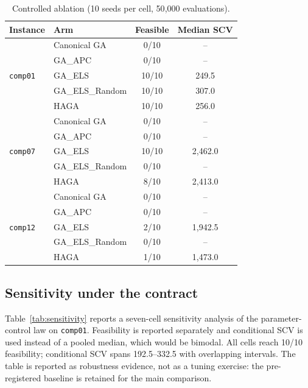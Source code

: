 \documentclass[journal]{IEEEtran}
\newcommand{\code}[1]{\texttt{#1}}
\begin{document}
\begin{table}[!t]
\caption{Controlled ablation (10 seeds per cell, 50{,}000 evaluations).}
\label{tab:ablation}
\centering
\small
\begin{tabular}{ll c c}
\toprule
Instance & Arm & Feasible & Median SCV \\
\midrule
\multirow{5}{*}{\code{comp01}}
& Canonical GA      & 0/10 & -- \\
& GA\_APC           & 0/10 & -- \\
& GA\_ELS           & 10/10 & 249.5 \\
& GA\_ELS\_Random   & 10/10 & 307.0 \\
& HAGA              & 10/10 & 256.0 \\
\midrule
\multirow{5}{*}{\code{comp07}}
& Canonical GA      & 0/10 & -- \\
& GA\_APC           & 0/10 & -- \\
& GA\_ELS           & 10/10 & 2{,}462.0 \\
& GA\_ELS\_Random   & 0/10 & -- \\
& HAGA              & 8/10 & 2{,}413.0 \\
\midrule
\multirow{5}{*}{\code{comp12}}
& Canonical GA      & 0/10 & -- \\
& GA\_APC           & 0/10 & -- \\
& GA\_ELS           & 2/10 & 1{,}942.5 \\
& GA\_ELS\_Random   & 0/10 & -- \\
& HAGA              & 1/10 & 1{,}473.0 \\
\bottomrule
\end{tabular}
\end{table}

\subsection{Sensitivity under the contract}
Table~\ref{tab:sensitivity} reports a seven-cell sensitivity analysis of the parameter-control law on \code{comp01}. Feasibility is reported separately and conditional SCV is used instead of a pooled median, which would be bimodal. All cells reach 10/10 feasibility; conditional SCV spans 192.5--332.5 with overlapping intervals. The table is reported as robustness evidence, not as a tuning exercise: the pre-registered baseline is retained for the main comparison.
\end{document}
